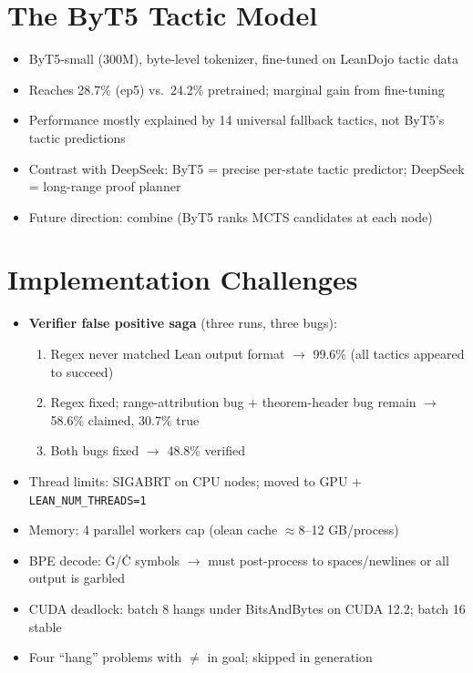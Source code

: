 \documentclass[openany, amssymb, psamsfonts]{amsart}
\begin{document}
\section{The ByT5 Tactic Model}
\label{sec:byt5}
\begin{itemize}
  \item ByT5-small (300M), byte-level tokenizer, fine-tuned on LeanDojo tactic data
  \item Reaches 28.7\% (ep5) vs.\ 24.2\% pretrained; marginal gain from fine-tuning
  \item Performance mostly explained by 14 universal fallback tactics, not ByT5's tactic predictions
  \item Contrast with DeepSeek: ByT5 = precise per-state tactic predictor; DeepSeek = long-range proof planner
  \item Future direction: combine (ByT5 ranks MCTS candidates at each node)
\end{itemize}

\section{Implementation Challenges}
\begin{itemize}
  \item \textbf{Verifier false positive saga} (three runs, three bugs):
  \begin{enumerate}
    \item Regex never matched Lean output format $\to$ 99.6\% (all tactics appeared to succeed)
    \item Regex fixed; range-attribution bug + theorem-header bug remain $\to$ 58.6\% claimed, 30.7\% true
    \item Both bugs fixed $\to$ 48.8\% verified
  \end{enumerate}
  \item Thread limits: SIGABRT on CPU nodes; moved to GPU + \texttt{LEAN\_NUM\_THREADS=1}
  \item Memory: 4 parallel workers cap (olean cache $\approx$8--12 GB/process)
  \item BPE decode: Ġ/Ċ symbols $\to$ must post-process to spaces/newlines or all output is garbled
  \item CUDA deadlock: batch 8 hangs under BitsAndBytes on CUDA 12.2; batch 16 stable
  \item Four ``hang'' problems with $\neq$ in goal; skipped in generation
\end{itemize}
\end{document}
